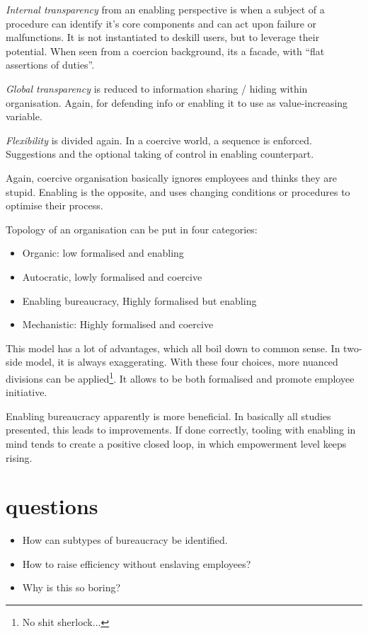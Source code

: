 \emph{Internal transparency} from an enabling perspective is when a subject of a procedure can identify it's core components and can act upon failure or malfunctions. 
It is not instantiated to deskill users, but to leverage their potential. 
When seen from a coercion background, its a facade, with ``flat assertions of duties''. 

\emph{Global transparency} is reduced to information sharing / hiding within organisation. 
Again, for defending info or enabling it to use as value-increasing variable.

\emph{Flexibility} is divided again. 
In a coercive world, a sequence is enforced. Suggestions and the optional taking of control in enabling counterpart. 

Again, coercive organisation basically ignores employees and thinks they are stupid. 
Enabling is the opposite, and uses changing conditions or procedures to optimise their process. 

Topology of an organisation can be put in four categories:
\begin{itemize}
\item Organic: low formalised and enabling
\item Autocratic, lowly formalised and coercive
\item Enabling bureaucracy, Highly formalised but enabling
\item Mechanistic: Highly formalised and coercive 
\end{itemize}

This model has a lot of advantages, which all boil down to common sense. 
In two-side model, it is always exaggerating. 
With these four choices, more nuanced divisions can be applied\footnote{No shit sherlock...}. 
It allows to be both formalised and promote employee initiative. 

Enabling bureaucracy apparently is more beneficial. 
In basically all studies presented, this leads to improvements. 
If done correctly, tooling with enabling in mind tends to create a positive closed loop, in which empowerment level keeps rising. 

\section{questions}
\begin{itemize}
  \item How can subtypes of bureaucracy be identified. 
  \item How to raise efficiency without enslaving employees?
  \item Why is this so boring?
\end{itemize}

